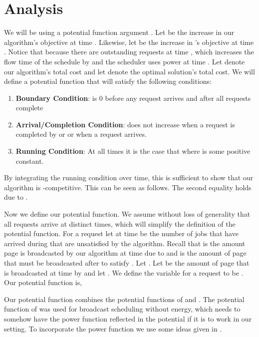 \documentclass[11pt]{article}
\begin{document}
\section{Analysis}

We will be using a potential function argument \cite{Edmonds00}.   Let  be the increase in our algorithm's objective at time .  Likewise, let  be the increase in 's objective at time . Notice that  because there are  outstanding requests at time , which increases the flow time of the schedule by  and the scheduler uses power  at time .  Let  denote our algorithm's total cost and let  denote the optimal solution's total cost.  We will define a potential function  that will satisfy the following conditions:

\begin{enumerate}
\item {\bf Boundary Condition}:  is 0 before any request arrives and  after all requests complete
\item {\bf Arrival/Completion Condition}:  does not increase when a request is completed by  or  or when a request arrives.
\item {\bf Running Condition}:  At all times  it is the case that  where  is some positive constant.
\end{enumerate}



By integrating the running condition over time, this is sufficient to show that our algorithm is -competitive. This can be seen as follows.  The second equality holds due to .





Now we define our potential function.   We assume without loss of generality that all requests arrive at distinct times, which will simplify the definition of the potential function.  For a request  let  at time  be the number of jobs that have arrived during   that are unsatisfied by the algorithm.  Recall that  is the amount page  is broadcasted by our algorithm at time  due to  and  is the amount of page  that must be broadcasted after  to satisfy .  Let .   Let  be the amount of page  that is broadcasted at time  by  and let .  We define the variable  for a request  to be .  Our potential function is,  





 Our potential function combines the potential functions of \cite{BansalKN09} and \cite{GuptaKP10}. The potential function of \cite{BansalKN09} was used for broadcast scheduling without energy, which needs to somehow have the power function reflected in the potential if it is to work in our setting. To incorporate the power function we use some ideas given in \cite{GuptaKP10}.   
\end{document}
